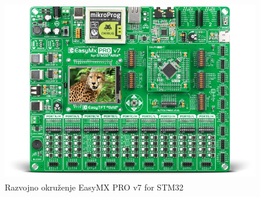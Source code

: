 \documentclass[a4paper, 12pt, oneside, titlepage]{article}
\begin{document}
      \begin{figure}[H]
        \centering
        \includegraphics[width=\textwidth]{slike/easymx}
        \caption{Razvojno okruženje EasyMX PRO\texttrademark{} v7 for STM32\textsuperscript{\textregistered}}
        \label{fig:easymx} %
      \end{figure}
      
\end{document}
